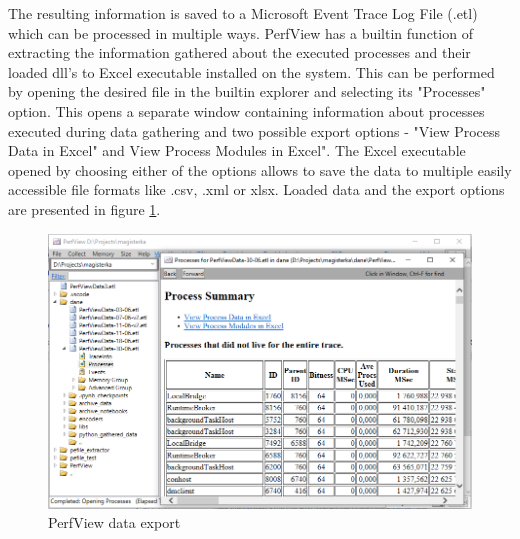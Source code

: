 \documentclass[a4paper,twoside,12pt]{book}
\begin{document}
The resulting information is saved to a Microsoft Event Trace Log File (.etl) which can be 
processed in multiple ways. PerfView has a builtin function of extracting the information 
gathered about the executed processes and their loaded dll's to Excel executable installed 
on the system. This can be performed by opening the desired file in the builtin explorer 
and selecting its "Processes" option. This opens a separate window containing information 
about processes executed during data gathering and two possible export options - 
"View Process Data in Excel" and View Process Modules in Excel". The Excel executable 
opened by choosing either of the options allows to save the data to multiple easily 
accessible file formats like .csv, .xml or xlsx. Loaded data and the export options are 
presented in figure \ref{fig:PerfViewexport}.

\begin{figure}
	\centering
	\includegraphics[scale=0.55]{images/perf_export}
	\caption{PerfView data export}
	\label{fig:PerfViewexport}
 \end{figure}
\end{document}
